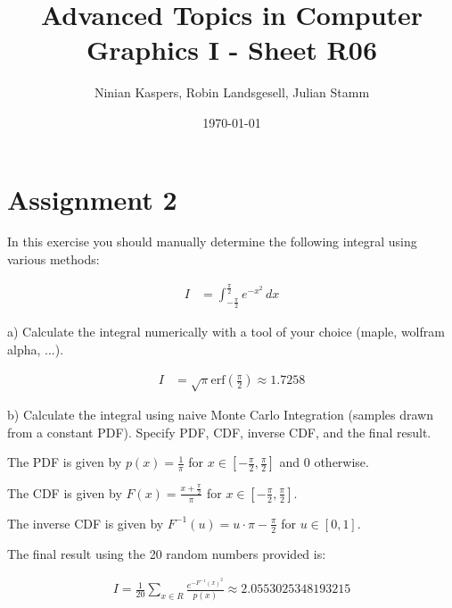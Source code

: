 \documentclass{article}
\title{Advanced Topics in Computer Graphics I - Sheet R06}
\author{Ninian Kaspers, Robin Landsgesell, Julian Stamm}
\date{\today}
\begin{document}
    \maketitle

    \section*{Assignment 2}

    In this exercise you should manually determine the following integral using various methods:

    \begin{align*}
        I &= \int_{-\frac{\pi}{2}}^{\frac{\pi}{2}} e^{-x^2} \, dx
    \end{align*}

    
    a) Calculate the integral numerically with a tool of your choice (maple, wolfram alpha, ...).

    \begin{align*}
        I &= \sqrt{\pi} \text{erf}(\frac{\pi}{2}) \approx 1.7258
    \end{align*}

    b) Calculate the integral using naive Monte Carlo Integration (samples drawn from a constant PDF). Specify PDF, CDF, inverse CDF, and the final result.

    The PDF is given by $p(x) = \frac{1}{\pi}$ for $x \in [-\frac{\pi}{2}, \frac{\pi}{2}]$ and 0 otherwise.
    
    The CDF is given by $F(x) = \frac{x + \frac{\pi}{2}}{\pi}$ for $x \in [-\frac{\pi}{2}, \frac{\pi}{2}]$.
    
    The inverse CDF is given by $F^{-1}(u) = u \cdot \pi - \frac{\pi}{2}$ for $u \in [0, 1]$.

    The final result using the 20 random numbers provided is:

    \begin{align*}
        I = \frac{1}{20} \sum_{x \in R} \frac{e^{-F^{-1}(x)^2}}{p(x)} \approx 2.0553025348193215
    \end{align*}
\end{document}
